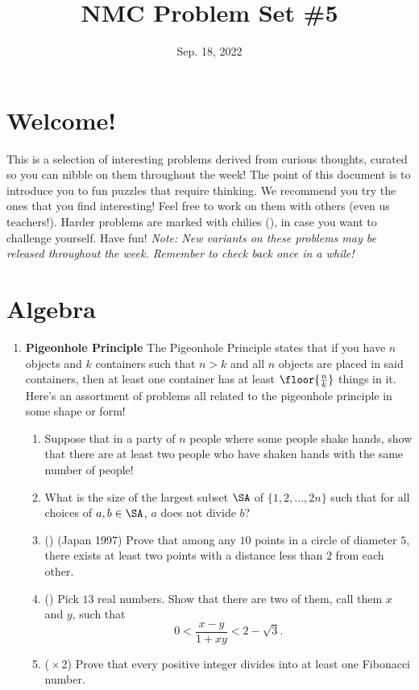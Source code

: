 \documentclass[11pt]{scrartcl}
\begin{document}
\title{NMC Problem Set \#5}
\date{Sep. 18, 2022} 
\maketitle

\section*{Welcome!}

This is a selection of interesting problems derived from curious thoughts, curated so you can nibble on them throughout the week! The point of this document is to introduce you to fun puzzles that require thinking. We recommend you try the ones that you find interesting! Feel free to work on them with others (even us teachers!). Harder problems are marked with chilies (\fullchili), in case you want to challenge yourself.
\newline\newline
Have fun! \textit{Note: New variants on these problems may be released throughout the week. Remember to check back once in a while!}
    
\section{Algebra}
\begin{enumerate}[label=\textbf{A\arabic*}.]
    \item \textbf{Pigeonhole Principle} \newline
    The Pigeonhole Principle states that if you have $n$ objects and $k$ containers such that $n>k$ and all $n$ objects are placed in said containers, then at least one container has at least $\floor{\frac{n}{k}}$ things in it. Here's an assortment of problems all related to the pigeonhole principle in some shape or form!
    \begin{enumerate}
        \item Suppose that in a party of $n$ people where some people shake hands, show that there are at least two people who have shaken hands with the same number of people!
        
        \item What is the size of the largest subset $\SA$ of $\{1, 2, \dots, 2n\}$ such that for all choices of $a, b \in \SA$, $a$ does not divide $b$?
        
        \item (\halfchili) (Japan 1997) Prove that among any $10$ points in a circle of diameter $5$, there exists at least two points with a distance less than $2$ from each other.
        
        \item (\fullchili) Pick $13$ real numbers. Show that there are two of them, call them $x$ and $y$, such that
        \[ 0 < \frac{x - y}{1 + xy} < 2 - \sqrt{3}. \]
        
        \item (\fullchili\,$\times$\,2) Prove that every positive integer divides into at least one Fibonacci number.
    \end{enumerate}
\end{enumerate}
\end{document}
